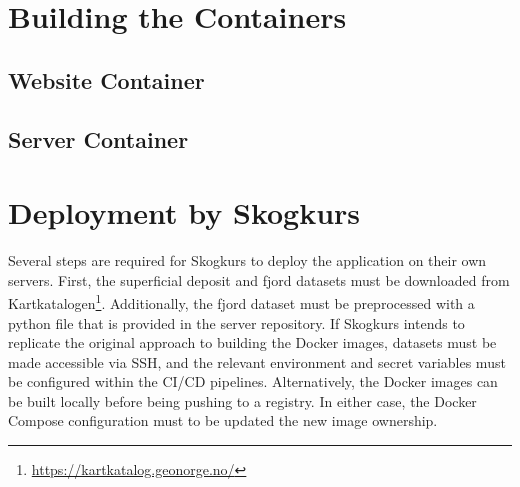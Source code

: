\section{Building the Containers}

\subsection{Website Container}



\subsection{Server Container}



\section{Deployment by Skogkurs}

Several steps are required for Skogkurs to deploy the application on their own servers. First, the superficial deposit and fjord datasets must be downloaded from Kartkatalogen\footnote{\url{https://kartkatalog.geonorge.no/}}. Additionally, the fjord dataset must be preprocessed with a python file that is provided in the server repository. If Skogkurs intends to replicate the original approach to building the Docker images, datasets must be made accessible via SSH, and the relevant environment and secret variables must be configured within the CI/CD pipelines. Alternatively, the Docker images can be built locally before being pushing to a registry. In either case, the Docker Compose configuration must to be updated the new image ownership.
